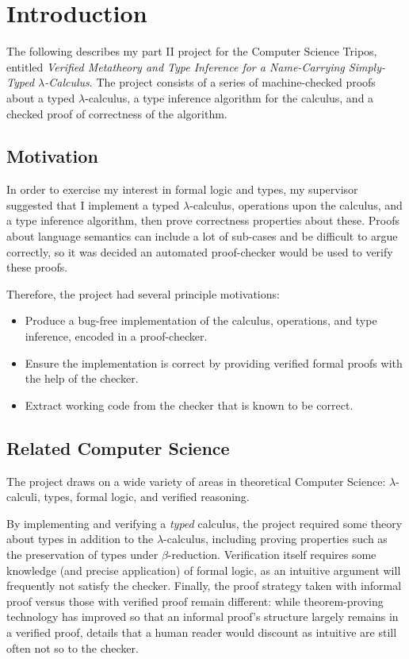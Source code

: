 \chapter{Introduction}
The following describes my part II project for the Computer Science Tripos, entitled \emph{Verified Metatheory and Type Inference for a Name-Carrying Simply-Typed \(\lambda\)-Calculus}.
The project consists of a series of machine-checked proofs about a typed \(\lambda\)-calculus, a type inference algorithm for the calculus, and a checked proof of correctness of the algorithm.

\section{Motivation}
In order to exercise my interest in formal logic and types, my supervisor suggested that I implement a typed \(\lambda\)-calculus, operations upon the calculus, and a type inference algorithm, then prove correctness properties about these.
Proofs about language semantics can include a lot of sub-cases and be difficult to argue correctly, so it was decided an automated proof-checker would be used to verify these proofs.

Therefore, the project had several principle motivations:
\begin{itemize}
\item
Produce a bug-free implementation of the calculus, operations, and type inference, encoded in a proof-checker.
\item
Ensure the implementation is correct by providing verified formal proofs with the help of the checker.
\item
Extract working code from the checker that is known to be correct.
\end{itemize}

\section{Related Computer Science}
The project draws on a wide variety of areas in theoretical Computer Science: \(\lambda\)-calculi, types, formal logic, and verified reasoning.

By implementing and verifying a \emph{typed} calculus, the project required some theory about types in addition to the \(\lambda\)-calculus, including proving properties such as the preservation of types under \(\beta\)-reduction.
Verification itself requires some knowledge (and precise application) of formal logic, as an intuitive argument will frequently not satisfy the checker.
Finally, the proof strategy taken with informal proof versus those with verified proof remain different: while theorem-proving technology has improved so that an informal proof's structure largely remains in a verified proof, details that a human reader would discount as intuitive are still often not so to the checker.

